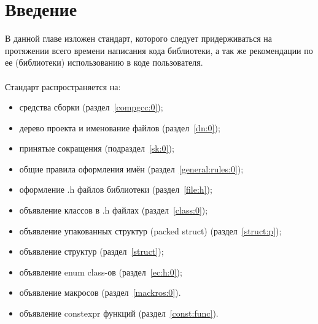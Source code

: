 \chapter{Введение}
В данной главе изложен стандарт, которого следует придерживаться на протяжении всего времени написания кода библиотеки, а так же рекомендации по ее (библиотеки) использованию в коде пользователя.\\\\
Стандарт распространяется на:
\begin{itemize}
	\item средства сборки (раздел~\ref{compgcc:0});
	\item дерево проекта и именование файлов (раздел~\ref{dn:0});
	\item принятые сокращения (подраздел~\ref{sk:0});
	\item общие правила оформления имён (раздел~\ref{general:rules:0});
	\item оформление .h файлов библиотеки (раздел~\ref{file:h});
	\item объявление классов в .h файлах (раздел~\ref{class:0});
	\item объявление упакованных структур (packed struct) (раздел~\ref{struct:p});
	\item объявление структур (раздел~\ref{struct});
	\item объявление enum class-ов (раздел~\ref{ec:h:0});
	\item объявление макросов (раздел~\ref{mackros:0}).
	\item объявление constexpr функций (раздел~\ref{const:func}).
\end{itemize}
